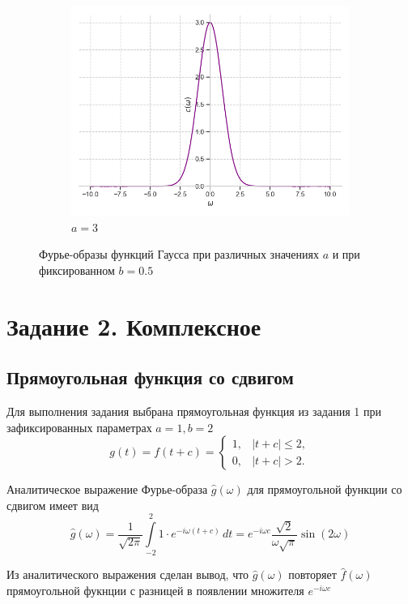 \documentclass[a4paper, 16pt]{article}
\begin{document}
\begin{figure}[htbp]
\begin{subfigure}{0.3\textwidth}
            \centering
            \includegraphics[width=\linewidth]{gausfimgeq_a=3_b=zp5.png}
            \caption{$a=3$}
            \label{fig:gausfimgeq_3}
        \end{subfigure}
        \caption{Фурье-образы функций Гаусса при различных значениях $a$ и при фиксированном $b=0.5$}
        \label{fig:gausfimgeqs}
    \end{figure}


    \newpage
    \section{Задание 2. Комплексное}
    \subsection{Прямоугольная функция со сдвигом}
    \noindent Для выполнения задания выбрана прямоугольная функция из задания 1 при зафиксированных
    параметрах $a=1,b=2$
    $$
    g(t)=f(t+c)=
    \begin{cases}
        1, & \left|t+c\right|\leq 2,\\
        0, & \left|t+c\right|>2.
    \end{cases}
    $$


    \noindent Аналитическое выражение Фурье-образа
    $\hat{g}(\omega)$ для прямоугольной функции со сдвигом имеет вид
    $$
    \hat{g}(\omega)=\dfrac{1}{\sqrt{2\pi}}\int\limits_{-2}^{2}1\cdot e^{-i\omega (t+c)}\,dt=
    e^{-i\omega c}\dfrac{\sqrt{2}}{\omega\sqrt{\pi}}\sin{(2\omega)}
    $$


    \noindent Из аналитического выражения сделан вывод, что $\hat{g}(\omega)$ повторяет $\hat{f}(\omega)$
    прямоугольной фукнции с разницей в появлении множителя $e^{-i\omega c}$
\end{document}
